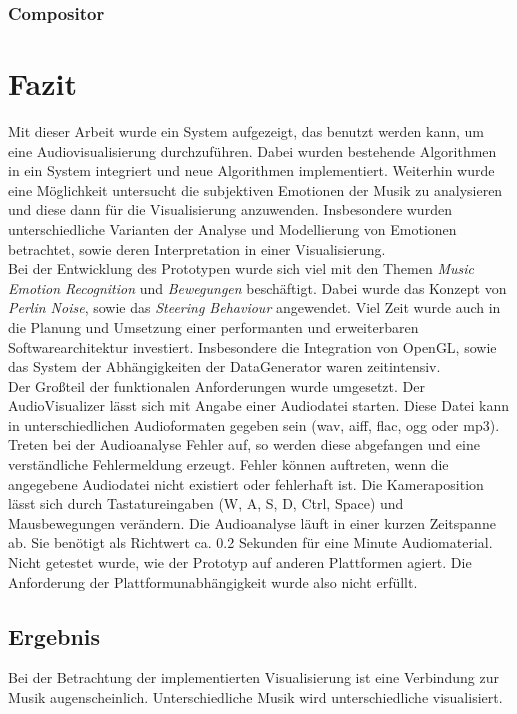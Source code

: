 \documentclass[11pt,a4paper]{article}
\begin{document}
\subsubsection{Compositor}

\newpage

\section{Fazit}
Mit dieser Arbeit wurde ein System aufgezeigt, das benutzt werden kann, um eine Audiovisualisierung durchzuführen. Dabei wurden bestehende Algorithmen in ein System integriert und neue Algorithmen implementiert. Weiterhin wurde eine Möglichkeit untersucht die subjektiven Emotionen der Musik zu analysieren und diese dann für die Visualisierung anzuwenden. Insbesondere wurden unterschiedliche Varianten der Analyse und Modellierung von Emotionen betrachtet, sowie deren Interpretation in einer Visualisierung.\\
Bei der Entwicklung des Prototypen wurde sich viel mit den Themen \textit{Music Emotion Recognition} und \textit{Bewegungen} beschäftigt. Dabei wurde das Konzept von \textit{Perlin Noise}, sowie das \textit{Steering Behaviour} angewendet. Viel Zeit wurde auch in die Planung und Umsetzung einer performanten und erweiterbaren Softwarearchitektur investiert. Insbesondere die Integration von OpenGL, sowie das System der Abhängigkeiten der DataGenerator waren zeitintensiv.\\
Der Großteil der funktionalen Anforderungen wurde umgesetzt. Der AudioVisualizer lässt sich mit Angabe einer Audiodatei starten. Diese Datei kann in unterschiedlichen Audioformaten gegeben sein (wav, aiff, flac, ogg oder mp3). Treten bei der Audioanalyse Fehler auf, so werden diese abgefangen und eine verständliche Fehlermeldung erzeugt. Fehler können auftreten, wenn die angegebene Audiodatei nicht existiert oder fehlerhaft ist. Die Kameraposition lässt sich durch Tastatureingaben (W, A, S, D, Ctrl, Space) und Mausbewegungen verändern. Die Audioanalyse läuft in einer kurzen Zeitspanne ab. Sie benötigt als Richtwert ca. 0.2 Sekunden für eine Minute Audiomaterial. Nicht getestet wurde, wie der Prototyp auf anderen Plattformen agiert. Die Anforderung der Plattformunabhängigkeit wurde also nicht erfüllt.

\subsection{Ergebnis}
Bei der Betrachtung der implementierten Visualisierung ist eine Verbindung zur Musik augenscheinlich. Unterschiedliche Musik wird unterschiedliche visualisiert.\\
% 



\newpage




\listoftables
\listoffigures
\end{document}
